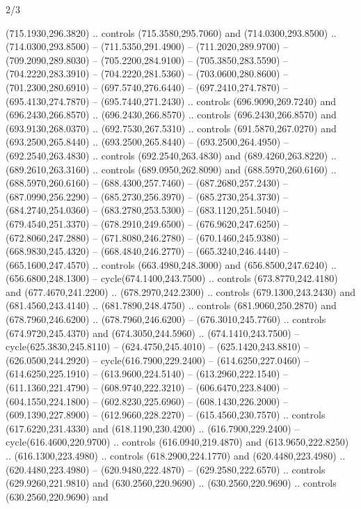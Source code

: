 \begin{flagdescription}{2/3}
\begin{scope}[xshift=0.5\flaglength,yshift=0.5\flagwidth,scale=\flagwidth/638.38]
\begin{scope}[y=0.80pt, x=0.80pt, yscale=-1,shift={(-600,-400)}]
\begin{scope}[shift={(-0.02,2.173)}]
  (715.1930,296.3820) .. controls (715.3580,295.7060) and (714.0300,293.8500) ..
  (714.0300,293.8500) -- (711.5350,291.4900) -- (711.2020,289.9700) --
  (709.2090,289.8030) -- (705.2200,284.9100) -- (705.3850,283.5590) --
  (704.2220,283.3910) -- (704.2220,281.5360) -- (703.0600,280.8600) --
  (701.2300,280.6910) -- (697.5740,276.6440) -- (697.2410,274.7870) --
  (695.4130,274.7870) -- (695.7440,271.2430) .. controls (696.9090,269.7240) and
  (696.2430,266.8570) .. (696.2430,266.8570) .. controls (696.2430,266.8570) and
  (693.9130,268.0370) .. (692.7530,267.5310) .. controls (691.5870,267.0270) and
  (693.2500,265.8440) .. (693.2500,265.8440) -- (693.2500,264.4950) --
  (692.2540,263.4830) .. controls (692.2540,263.4830) and (689.4260,263.8220) ..
  (689.2610,263.3160) .. controls (689.0950,262.8090) and (688.5970,260.6160) ..
  (688.5970,260.6160) -- (688.4300,257.7460) -- (687.2680,257.2430) --
  (687.0990,256.2290) -- (685.2730,256.3970) -- (685.2730,254.3730) --
  (684.2740,254.0360) -- (683.2780,253.5300) -- (683.1120,251.5040) --
  (679.4540,251.3370) -- (678.2910,249.6500) -- (676.9620,247.6250) --
  (672.8060,247.2880) -- (671.8080,246.2780) -- (670.1460,245.9380) --
  (668.9830,245.4320) -- (668.4840,246.2770) -- (665.3240,246.4440) --
  (665.1600,247.4570) .. controls (663.4980,248.3000) and (656.8500,247.6240) ..
  (656.6800,248.1300) -- cycle(674.1400,243.7500) .. controls
  (673.8770,242.4180) and (677.4670,241.2200) .. (678.2970,242.2300) .. controls
  (679.1300,243.2430) and (681.4560,243.4140) .. (681.7890,248.4750) .. controls
  (681.9060,250.2870) and (678.7960,246.6200) .. (678.7960,246.6200) --
  (676.3010,245.7760) .. controls (674.9720,245.4370) and (674.3050,244.5960) ..
  (674.1410,243.7500) -- cycle(625.3830,245.8110) -- (624.4750,245.4010) --
  (625.1420,243.8810) -- (626.0500,244.2920) -- cycle(616.7900,229.2400) --
  (614.6250,227.0460) -- (614.6250,225.1910) -- (613.9600,224.5140) --
  (613.2960,222.1540) -- (611.1360,221.4790) -- (608.9740,222.3210) --
  (606.6470,223.8400) -- (604.1550,224.1800) -- (602.8230,225.6960) --
  (608.1430,226.2000) -- (609.1390,227.8900) -- (612.9660,228.2270) --
  (615.4560,230.7570) .. controls (617.6220,231.4330) and (618.1190,230.4200) ..
  (616.7900,229.2400) -- cycle(616.4600,220.9700) .. controls
  (616.0940,219.4870) and (613.9650,222.8250) .. (616.1300,223.4980) .. controls
  (618.2900,224.1770) and (620.4480,223.4980) .. (620.4480,223.4980) --
  (620.9480,222.4870) -- (629.2580,222.6570) .. controls (629.9260,221.9810) and
  (630.2560,220.9690) .. (630.2560,220.9690) .. controls (630.2560,220.9690) and

\end{scope}
\end{scope}
\end{scope}
\end{flagdescription}
